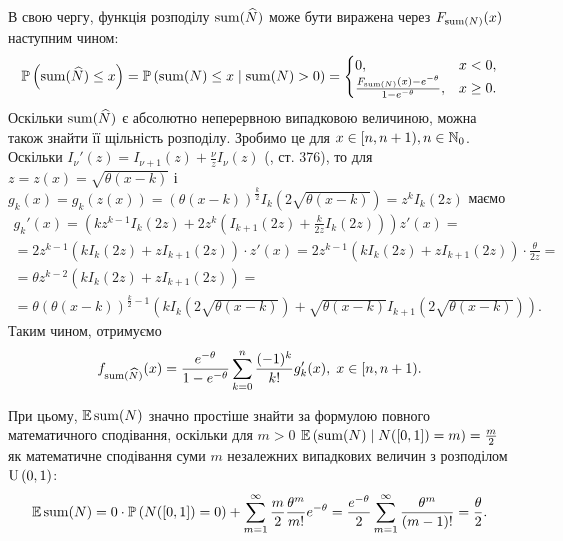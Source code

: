 В свою чергу, функція розподілу $\operatorname{sum}(\widehat{N})$ 
може бути виражена через $F_{\operatorname{sum}(N)}(x)$ наступним чином:
\begin{gather}
    \mathbb{P}\left(\operatorname{sum}(\widehat{N}) \leq x\right) = \mathbb{P}\left(\operatorname{sum}(N) \leq x \mid \operatorname{sum}(N) > 0\right) = 
    \begin{cases}
        0, & x < 0, \\
        \frac{F_{\operatorname{sum}(N)}(x) - e^{-\theta}}{1-e^{-\theta}}, & x \geq 0.
    \end{cases}
\end{gather}
Оскільки $\operatorname{sum}(\widehat{N})$ є абсолютно неперервною випадковою величиною, можна також знайти
її щільність розподілу. Зробимо це для $x \in [n, n+1), n \in \mathbb{N}_0$. Оскільки
$I_{\nu} ' (z) = I_{\nu+1} (z) + \frac{\nu}{z} I_{\nu} (z)$ (\cite{Abramowitz_Stegun}, ст. 376),
то для $z = z(x) = \sqrt{\theta(x-k)}$ і 
$g_k(x) = g_k(z(x)) = \left(\theta (x - k)\right)^{\frac{k}{2}} I_k\left(2\sqrt{\theta(x-k)}\right) = z^k I_k(2z)$
маємо
\begin{gather*}
    g_k'(x) = \left(
        k z^{k-1} I_k(2z) + 2 z^k \left(I_{k+1}(2z) + \frac{k}{2z} I_k(2z)\right)
    \right) z'(x) = \\ =
    2 z^{k-1} \left(k I_k(2z) + z I_{k+1}(2z)\right) \cdot z'(x) = 
    2 z^{k-1} \left(k I_k(2z) + z I_{k+1}(2z)\right) \cdot \frac{\theta}{2 z} = \\ =
    \theta z^{k-2} \left(k I_k(2z) + z I_{k+1}(2z)\right) = \\ =
    \theta \left(\theta (x - k)\right)^{\frac{k}{2}-1}
    \left(
        k I_k \left(2 \sqrt{\theta (x - k)} \right) + 
        \sqrt{\theta (x - k)} I_{k+1} \left(2 \sqrt{\theta (x - k)}\right)
    \right).
\end{gather*}
Таким чином, отримуємо
\begin{gather}
    f_{\operatorname{sum}(\widehat{N})}(x) = \frac{e^{-\theta}}{1 - e^{-\theta}} \sum_{k=0}^{n} \frac{(-1)^k}{k!} g_k'(x), \; x \in [n, n+1).
\end{gather}

При цьому, $\mathbb{E}\operatorname{sum}(N)$ значно простіше знайти
за формулою повного математичного сподівання,
оскільки для $m > 0$ $\mathbb{E}\left(\operatorname{sum}(N) \mid N([0, 1]) = m\right) = \frac{m}{2}$
як математичне сподівання суми $m$ незалежних випадкових величин
з розподілом $\mathrm{U}\left(0, 1\right)$:
\begin{gather*}
    \mathbb{E}\operatorname{sum}(N) = 0\cdot \mathbb{P}\left(N([0, 1]) = 0\right) +
    \sum_{m=1}^{\infty} \frac{m}{2} \frac{\theta^m}{m!} e^{-\theta} =
    \frac{e^{-\theta}}{2}\sum_{m=1}^{\infty} \frac{\theta^m}{(m-1)!} = \frac{\theta}{2}.
\end{gather*}

